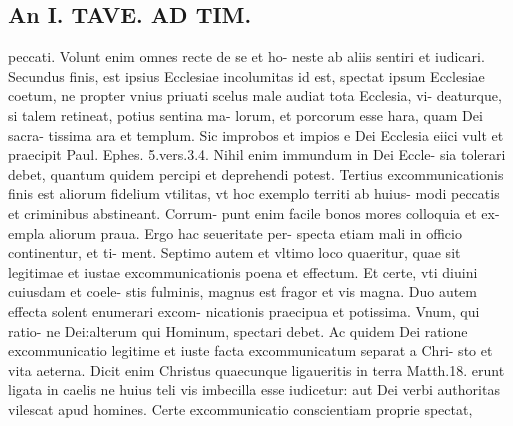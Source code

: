 \documentclass{article}
\begin{document}
\begin{pages}
\section*{An I. TAVE. AD TIM. }
\marginpar{[ p.403 ]}\pstart peccati. Volunt enim omnes recte de se et ho- neste ab aliis sentiri et iudicari. Secundus finis, est ipsius Ecclesiae incolumitas id est, spectat ipsum Ecclesiae coetum, ne propter vnius priuati scelus male audiat tota Ecclesia, vi- deaturque, si talem retineat, potius sentina ma- lorum, et porcorum esse hara, quam Dei sacra- tissima ara et templum. Sic improbos et impios e Dei Ecclesia eiici vult et praecipit Paul. Ephes. 5.vers.3.4. Nihil enim immundum in Dei Eccle- sia tolerari debet, quantum quidem percipi et deprehendi potest. Tertius excommunicationis finis est aliorum fidelium vtilitas, vt hoc exemplo territi ab huius- modi peccatis et criminibus abstineant. Corrum- punt enim facile bonos mores colloquia et ex- empla aliorum praua. Ergo hac seueritate per- specta etiam mali in officio continentur, et ti- ment. Septimo autem et vltimo loco quaeritur, quae sit legitimae et iustae excommunicationis poena et effectum. Et certe, vti diuini cuiusdam et coele- stis fulminis, magnus est fragor et vis magna. Duo autem effecta solent enumerari excom- nicationis praecipua et potissima. Vnum, qui ratio- ne Dei:alterum qui Hominum, spectari debet. Ac quidem Dei ratione excommunicatio legitime et iuste facta excommunicatum separat a Chri- sto et vita aeterna. Dicit enim Christus quaecunque ligaueritis in terra Matth.18. erunt ligata in caelis ne huius teli vis imbecilla esse iudicetur: aut Dei verbi authoritas vilescat apud homines. Certe excommunicatio conscientiam proprie spectat,  \pend

\end{pages}
\end{document}
